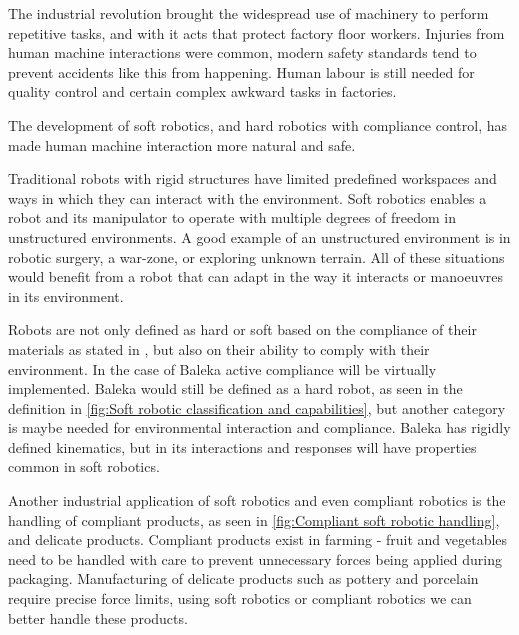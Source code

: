 The industrial revolution brought the widespread use of machinery to perform repetitive tasks, and with it acts that protect factory floor workers. Injuries from human machine interactions were common, modern safety standards tend to prevent accidents like this from happening. Human labour is still needed for quality control and certain complex awkward tasks in factories. 

The development of soft robotics, and hard robotics with compliance control, has made human machine interaction more natural and safe.

Traditional robots with rigid structures have limited predefined workspaces and ways in which they can interact with the environment.\cite{Trivedi2008} Soft robotics enables a robot and its manipulator to operate with multiple degrees of freedom in unstructured environments.\cite{Trivedi2008} A good example of an unstructured environment is in robotic surgery, a war-zone, or exploring unknown terrain. All of these situations would benefit from a robot that can adapt in the way it interacts or manoeuvres in its environment.

Robots are not only defined as hard or soft based on the compliance of their materials as stated in \cite{Trivedi2008}, but also on their ability to comply with their environment. In the case of Baleka active compliance will be virtually implemented. Baleka would still be defined as a hard robot, as seen in the definition in \cref{fig:Soft robotic classification and capabilities}, but another category is maybe needed for environmental interaction and compliance. Baleka has rigidly defined kinematics, but in its interactions and responses will have properties common in soft robotics.

Another industrial application of soft robotics and even compliant robotics is the handling of compliant products, as seen in \cref{fig:Compliant soft robotic handling}, and delicate products. Compliant products exist in farming - fruit and vegetables need to be handled with care to prevent unnecessary forces being applied during packaging. Manufacturing of delicate products such as pottery and porcelain require precise force limits, using soft robotics or compliant robotics we can better handle these products. 

